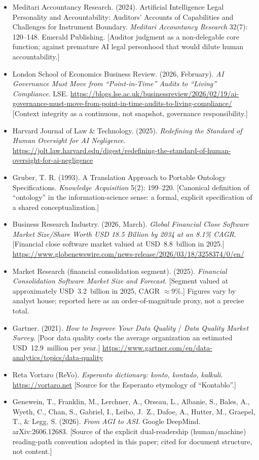 \documentclass[12pt]{clapps}  %
\begin{document}
\begin{itemize}
    \item Meditari Accountancy Research. (2024). Artificial Intelligence Legal Personality and Accountability: Auditors' Accounts of Capabilities and Challenges for Instrument Boundary. \textit{Meditari Accountancy Research} 32(7): 120--148. Emerald Publishing. [Auditor judgment as a non-delegable core function; against premature AI legal personhood that would dilute human accountability.]
    \item London School of Economics Business Review. (2026, February). \textit{AI Governance Must Move from ``Point-in-Time'' Audits to ``Living'' Compliance}. LSE. \url{https://blogs.lse.ac.uk/businessreview/2026/02/19/ai-governance-must-move-from-point-in-time-audits-to-living-compliance/} [Context integrity as a continuous, not snapshot, governance responsibility.]
    \item Harvard Journal of Law \& Technology. (2025). \textit{Redefining the Standard of Human Oversight for AI Negligence}. \url{https://jolt.law.harvard.edu/digest/redefining-the-standard-of-human-oversight-for-ai-negligence}
    \item Gruber, T. R. (1993). A Translation Approach to Portable Ontology Specifications. \textit{Knowledge Acquisition} 5(2): 199--220. [Canonical definition of ``ontology'' in the information-science sense: a formal, explicit specification of a shared conceptualization.]
    \item Business Research Industry. (2026, March). \textit{Global Financial Close Software Market Size/Share Worth USD 18.5 Billion by 2034 at an 8.1\% CAGR}. [Financial close software market valued at USD~8.8~billion in 2025.] \url{https://www.globenewswire.com/news-release/2026/03/18/3258374/0/en/}
    \item Market Research (financial consolidation segment). (2025). \textit{Financial Consolidation Software Market Size and Forecast}. [Segment valued at approximately USD~3.2~billion in 2025, CAGR $\approx$9\%.] Figures vary by analyst house; reported here as an order-of-magnitude proxy, not a precise total.
    \item Gartner. (2021). \textit{How to Improve Your Data Quality} / \textit{Data Quality Market Survey}. [Poor data quality costs the average organization an estimated USD~12.9~million per year.] \url{https://www.gartner.com/en/data-analytics/topics/data-quality}
    \item Reta Vortaro (ReVo). \textit{Esperanto dictionary: konto, kontado, kalkuli}. \url{https://vortaro.net} [Source for the Esperanto etymology of ``Kontablo''.]
    \item Genewein, T., Franklin, M., Lerchner, A., Orseau, L., Albanie, S., Bales, A., Wyeth, C., Chan, S., Gabriel, I., Leibo, J.~Z., Dafoe, A., Hutter, M., Graepel, T., \& Legg, S. (2026). \textit{From AGI to ASI}. Google DeepMind. arXiv:2606.12683. [Source of the explicit dual-readership (human/machine) reading-path convention adopted in this paper; cited for document structure, not content.]
\end{itemize}
\end{document}
